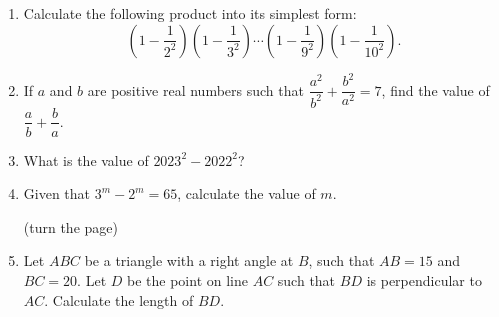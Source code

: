 \documentclass[12pt]{article}
\begin{document}
\begin{enumerate}[topsep=2\bigskipamount,itemsep=1.4\bigskipamount]
\item Calculate the following product into its simplest form:
\[ \left(1 - \frac{1}{2^2}\right)\left(1 - \frac{1}{3^2}\right)\cdots \left(1 - \frac{1}{9^2}\right)\left(1 - \frac{1}{10^2}\right). \]



\item If $a$ and $b$ are positive real numbers such that $\dfrac{a^2}{b^2}+\dfrac{b^2}{a^2} = 7$, find the value of $\dfrac{a}{b}+\dfrac{b}{a}$.


\item What is the value of $2023^2-2022^2$?


\item Given that $3^m-2^m = 65$, calculate the value of $m$.

\hfill (turn the page)

\pagebreak

\item
\begin{multicols}{2}
Let $ABC$ be a triangle with a right angle at $B$, such that $AB = 15$ and $BC = 20$.
Let $D$ be the point on line $AC$ such that $BD$ is perpendicular to $AC$.
Calculate the length of $BD$.
\begin{center}
\end{center}
\end{multicols}


\end{enumerate}
\end{document}
